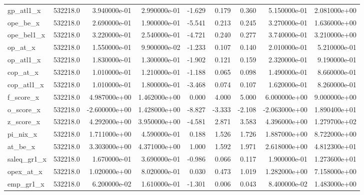 \documentclass[12pt]{article}
\begin{document}
\begin{landscape}
\begin{longtable}{|l|r|r|r|r|r|r|r|r|}
		gp\_atl1\_x              & 532218.0 & 3.940000e-01  & 2.990000e-01 & -1.629     & 0.179       & 0.360       & 5.150000e-01  & 2.081000e+00 \\
		ope\_be\_x               & 532218.0 & 2.690000e-01  & 1.900000e-01 & -5.541     & 0.213       & 0.245       & 3.270000e-01  & 1.636000e+00 \\
		ope\_bel1\_x             & 532218.0 & 3.220000e-01  & 2.540000e-01 & -4.721     & 0.240       & 0.277       & 3.740000e-01  & 3.210000e+00 \\
		op\_at\_x                & 532218.0 & 1.550000e-01  & 9.900000e-02 & -1.233     & 0.107       & 0.140       & 2.010000e-01  & 5.210000e-01 \\
		op\_atl1\_x              & 532218.0 & 1.830000e-01  & 1.300000e-01 & -1.902     & 0.121       & 0.159       & 2.320000e-01  & 9.190000e-01 \\
		cop\_at\_x               & 532218.0 & 1.010000e-01  & 1.210000e-01 & -1.188     & 0.065       & 0.098       & 1.490000e-01  & 8.660000e-01 \\
		cop\_atl1\_x             & 532218.0 & 1.010000e-01  & 1.800000e-01 & -3.468     & 0.074       & 0.107       & 1.620000e-01  & 8.260000e-01 \\
		f\_score\_x              & 532218.0 & 4.987000e+00  & 1.462000e+00 & 0.000      & 4.000       & 5.000       & 6.000000e+00  & 9.000000e+00 \\
		o\_score\_x              & 532218.0 & -2.600000e+00 & 1.428000e+00 & -8.827     & -3.333      & -2.108      & -2.063000e+00 & 1.890400e+01 \\
		z\_score\_x              & 532218.0 & 4.292000e+00  & 3.950000e+00 & -4.581     & 2.871       & 3.583       & 4.396000e+00  & 1.279700e+02 \\
		pi\_nix\_x               & 532218.0 & 1.711000e+00  & 4.590000e-01 & 0.188      & 1.526       & 1.726       & 1.887000e+00  & 8.722000e+00 \\
		at\_be\_x                & 532218.0 & 3.303000e+00  & 4.371000e+00 & 1.000      & 1.592       & 1.971       & 2.618000e+00  & 4.812300e+01 \\
		saleq\_gr1\_x            & 532218.0 & 1.670000e-01  & 3.690000e-01 & -0.986     & 0.066       & 0.117       & 1.900000e-01  & 1.273600e+01 \\
		opex\_at\_x              & 532218.0 & 1.020000e+00  & 8.020000e-01 & 0.030      & 0.473       & 1.019       & 1.282000e+00  & 7.158000e+00 \\
		emp\_gr1\_x              & 532218.0 & 6.200000e-02  & 1.610000e-01 & -1.301     & 0.006       & 0.043       & 8.400000e-02  & 1.483000e+00 \\

\end{longtable}
\end{landscape}
\end{document}
